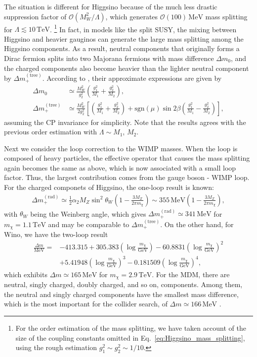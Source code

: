\documentclass[12pt,twoside,book]{article}
\begin{document}
The situation is different for Higgsino because of the much less drastic suppression factor of $\mathcal{O} (M_W^2 / \Lambda)$, which generates $\mathcal{O} (100)\,\mathrm{MeV}$ mass splitting for $\Lambda \lesssim \mathrm{10}\,\mathrm{TeV}$.
\footnote{
  For the order estimation of the mass splitting, we have taken account of the size of the coupling constants omitted in Eq.~\eqref{eq:Higgsino_mass_splitting}, using the rough estimation $g_1^2 \sim g_2^2 \sim 1/10$.
}
In fact, in models like the split SUSY, the mixing between Higgsino and heavier gauginos can generate the large mass splitting among the Higgsino components.
As a result, neutral components that originally forms a Dirac fermion splits into two Majorana fermions with mass difference $\Delta m_0$, and the charged components also become heavier than the lighter neutral component by $\Delta m_{+}^{\mathrm{(tree)}}$.
According to \cite{Fukuda:2017jmk}, their approximate expressions are given by
\begin{align}
  \Delta m_0 &\simeq \frac{M_W^2}{g_2^2} \left( \frac{g_1^2}{M_1} + \frac{g_2^2}{M_2} \right),\\
  \Delta m_{+}^{\mathrm{(tree)}} &\simeq \frac{M_W^2}{2 g_2^2} \left[
  \left( \frac{g_1^2}{M_1} + \frac{g_2^2}{M_2} \right)
  + \mathrm{sgn} (\mu) \sin 2\beta \left( \frac{g_1^2}{M_1} - \frac{g_2^2}{M_2} \right) \right],
\end{align}
assuming the CP invariance for simplicity.
Note that the results agrees with the previous order estimation with $\Lambda \sim M_1$, $M_2$.

Next we consider the loop correction to the WIMP masses.
When the loop is composed of heavy particles, the effective operator that causes the mass splitting again becomes the same as above, which is now associated with a small loop factor.
Thus, the largest contribution comes from the gauge boson - WIMP loop.
For the charged componets of Higgsino, the one-loop result is known: \cite{Fukuda:2017jmk}
\begin{align}
  \Delta m_{+}^{\mathrm{(rad)}} \simeq \frac{1}{2} \alpha_2 M_Z \sin^2 \theta_W
  \left( 1 - \frac{3 M_Z}{2\pi m_\chi} \right)
  \sim 355\,\mathrm{MeV} \left( 1 - \frac{3 M_Z}{2\pi m_\chi} \right),
\end{align}
with $\theta_W$ being the Weinberg angle, which gives $\Delta m_{+}^{\mathrm{(rad)}} \simeq 341\,\mathrm{MeV}$ for $m_\chi = 1.1\,\mathrm{TeV}$ and may be comparable to $\Delta m_{+}^{\mathrm{(tree)}}$.
On the other hand, for Wino, we have the two-loop result \cite{Ibe:2012sx}
\newcommand{\logmchi}{\left( \log \frac{m_\chi}{\mathrm{GeV}} \right)}
\begin{align}
  \frac{\Delta m}{\mathrm{MeV}} =
  &-413.315 + 305.383 \logmchi - 60.8831 \logmchi^2\\
  &+ 5.41948 \logmchi^3 - 0.181509 \logmchi^4,
\end{align}
which exhibits $\Delta m \simeq 165\,\mathrm{MeV}$ for $m_\chi = 2.9\,\mathrm{TeV}$.
For the MDM, there are neutral, singly charged, doubly charged, and so on, components.
Among them, the neutral and singly charged components have the smallest mass difference, which is the most important for the collider search, of $\Delta m \simeq 166\, \mathrm{MeV}$ \cite{Cirelli:2005uq}.
\end{document}
